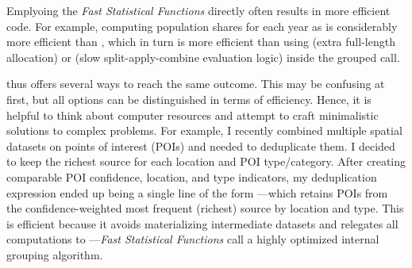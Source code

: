 \documentclass[nojss]{jss} %
\newcommand{\fct}[1]{\code{#1()}}
\begin{document}
Emplyoing the \emph{Fast Statistical Functions} directly often results in more efficient code. For example, computing population shares for each year as  is considerably more efficient than , which in turn is more efficient than using  (extra full-length allocation) or  (slow split-apply-combine evaluation logic) inside the grouped \fct{fmutate} call. \newline

 thus offers several ways to reach the same outcome. This may be confusing at first, but all options can be distinguished in terms of efficiency. Hence, it is helpful to think about computer resources and attempt to craft minimalistic solutions to complex problems. For example, I recently combined multiple spatial datasets on points of interest (POIs) and needed to deduplicate them. I decided to keep the richest source for each location and POI type/category. After creating comparable POI confidence, location, and type indicators, my deduplication expression ended up being a single line of the form ---which retains POIs from the confidence-weighted most frequent (richest) source by location and type. This is efficient because it avoids materializing intermediate datasets and relegates all computations to \fct{fmode}---\emph{Fast Statistical Functions} call a highly optimized internal grouping algorithm.
%
\end{document}
